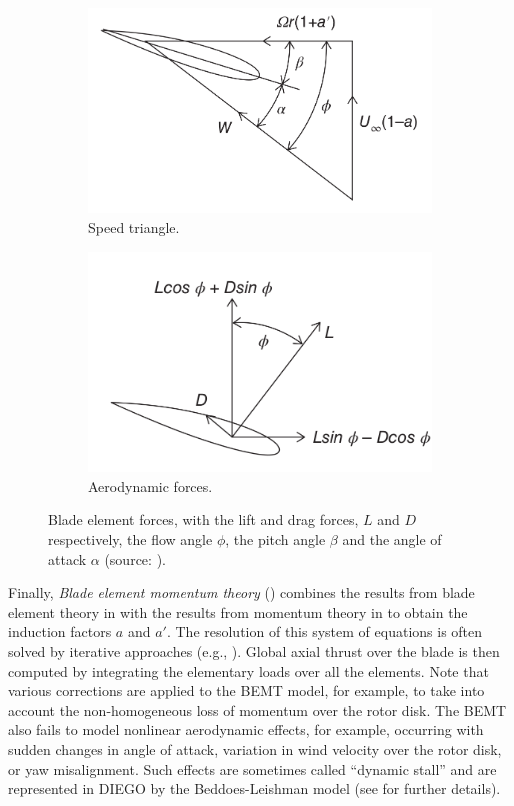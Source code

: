 \begin{figure}[h!]
    \begin{subfigure}[b]{0.5\textwidth}
        \centering
        \includegraphics[width=0.9\linewidth]{./part1/figures/speed_triangle.png}
        \caption{Speed triangle.}
    \end{subfigure}
    \begin{subfigure}[b]{0.5\textwidth}
        \centering
        \includegraphics[width=0.9\linewidth]{./part1/figures/aerodyn_blade.png}
        \caption{Aerodynamic forces.}
    \end{subfigure}
    \caption{Blade element forces, with the lift and drag forces, $L$ and $D$ respectively, the flow angle $\phi$, the pitch angle $\beta$ and the angle of attack $\alpha$ (source: \citealp{burton_2021_wind_handbook}).}
    \label{fig:blade_theory}
\end{figure}
Finally, \textit{Blade element momentum theory} () combines the results from blade element theory in  with the results from momentum theory in  to obtain the induction factors $a$ and $a'$. 
The resolution of this system of equations is often solved by iterative approaches (e.g., \citealp{dai_2011_BEMT}). 
Global axial thrust over the blade is then computed by integrating the elementary loads over all the elements. 
Note that various corrections are applied to the BEMT model, for example, to take into account the non-homogeneous loss of momentum over the rotor disk. 
The BEMT also fails to model nonlinear aerodynamic effects, for example, occurring with sudden changes in angle of attack, variation in wind velocity over the rotor disk, or yaw misalignment.
Such effects are sometimes called ``dynamic stall'' and are represented in DIEGO by the Beddoes-Leishman model (see \citealp{burton_2021_wind_handbook} for further details).  

